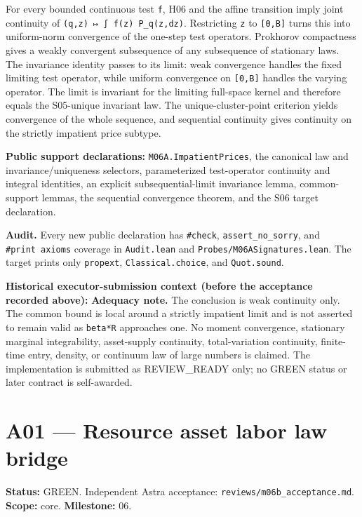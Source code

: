 \documentclass[
  11pt,
]{article}
\let\LedgerOriginalTexttt\texttt
\renewcommand{\texttt}[1]{{\small\LedgerOriginalTexttt{#1}}}
\begin{document}
For every bounded continuous test \texttt{f}, H06 and the affine
transition imply joint continuity of
\texttt{(q,z)\ ↦\ ∫\ f(z\textquotesingle{})\ P\_q(z,dz\textquotesingle{})}.
Restricting \texttt{z} to \texttt{{[}0,B{]}} turns this into
uniform-norm convergence of the one-step test operators. Prokhorov
compactness gives a weakly convergent subsequence of any subsequence of
stationary laws. The invariance identity passes to its limit: weak
convergence handles the fixed limiting test operator, while uniform
convergence on \texttt{{[}0,B{]}} handles the varying operator. The
limit is invariant for the limiting full-space kernel and therefore
equals the S05-unique invariant law. The unique-cluster-point criterion
yields convergence of the whole sequence, and sequential continuity
gives continuity on the strictly impatient price subtype.

\textbf{Public support declarations:} \texttt{M06A.ImpatientPrices}, the
canonical law and invariance/uniqueness selectors, parameterized
test-operator continuity and integral identities, an explicit
subsequential-limit invariance lemma, common-support lemmas, the
sequential convergence theorem, and the S06 target declaration.

\textbf{Audit.} Every new public declaration has \texttt{\#check},
\texttt{assert\_no\_sorry}, and \texttt{\#print\ axioms} coverage in
\texttt{Audit.lean} and \texttt{Probes/M06ASignatures.lean}. The target
prints only \texttt{propext}, \texttt{Classical.choice}, and
\texttt{Quot.sound}.

\textbf{Historical executor-submission context (before the acceptance
recorded above):} \textbf{Adequacy note.} The conclusion is weak
continuity only. The common bound is local around a strictly impatient
limit and is not asserted to remain valid as \texttt{beta*R} approaches
one. No moment convergence, stationary marginal integrability,
asset-supply continuity, total-variation continuity, finite-time entry,
density, or continuum law of large numbers is claimed. The
implementation is submitted as REVIEW\_READY only; no GREEN status or
later contract is self-awarded.

\section{A01 --- Resource asset labor law
bridge}\label{a01-resource-asset-labor-law-bridge}

\textbf{Status:} GREEN. Independent Astra acceptance:
\texttt{reviews/m06b\_acceptance.md}. \textbf{Scope:} core.
\textbf{Milestone:} 06.
\end{document}
